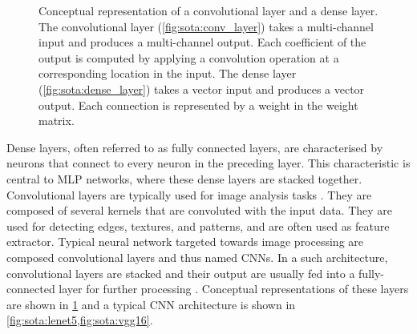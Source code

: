 \begin{figure}[htbp]
    \centering
        \caption{Conceptual representation of a convolutional layer and a dense
        layer. The convolutional layer (\cref{fig:sota:conv_layer}) takes a
        multi-channel input and produces a multi-channel output. Each coefficient of
        the output is computed by applying a convolution operation at a
        corresponding location in the input. The dense layer
        (\cref{fig:sota:dense_layer}) takes a vector input and produces a vector
        output. Each connection is represented by a weight in the weight matrix.}
    \label{fig:sota:layers}
    \end{figure}


Dense layers, often referred to as fully connected layers, are characterised by
neurons that connect to every neuron in the preceding layer. This characteristic
is central to \ac{MLP} networks, where these dense layers are stacked together.
Convolutional layers are typically used for image analysis tasks
\cite{DBLP:journals/pieee/LeCunBBH98}. They are composed of several kernels that
are convoluted with the input data. They are used for detecting edges, textures,
and patterns, and are often used as feature extractor. Typical neural network
targeted towards image processing are composed convolutional layers and thus
named \aclp{CNN}. In a such architecture, convolutional layers are stacked and
their output are usually fed into a fully-connected layer for further processing
\cite{DBLP:journals/corr/SimonyanZ14a,DBLP:conf/cvpr/HeZRS16,huang2017densely}.
Conceptual representations of these layers are shown in \cref{fig:sota:layers}
and a typical \ac{CNN} architecture is shown in
\cref{fig:sota:lenet5,fig:sota:vgg16}.\\

